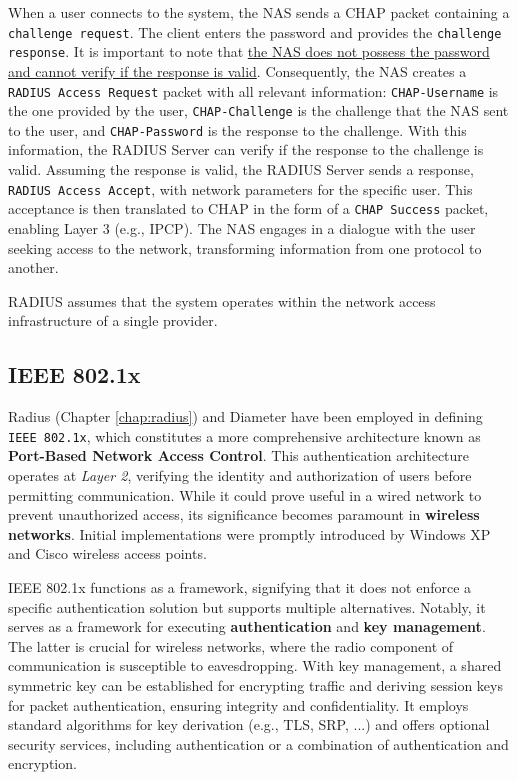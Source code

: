 When a user connects to the system, the NAS sends a CHAP packet containing a \texttt{challenge request}. The client enters the password and provides the \texttt{challenge response}. It is important to note that \underline{the NAS does not possess the password and cannot verify if the response is valid}. Consequently, the NAS creates a \texttt{RADIUS Access Request} packet with all relevant information: \texttt{CHAP-Username} is the one provided by the user, \texttt{CHAP-Challenge} is the challenge that the NAS sent to the user, and \texttt{CHAP-Password} is the response to the challenge. With this information, the RADIUS Server can verify if the response to the challenge is valid. Assuming the response is valid, the RADIUS Server sends a response, \texttt{RADIUS Access Accept}, with network parameters for the specific user. This acceptance is then translated to CHAP in the form of a \texttt{CHAP Success} packet, enabling Layer 3 (e.g., IPCP).
The NAS engages in a dialogue with the user seeking access to the network, transforming information from one protocol to another.

RADIUS assumes that the system operates within the network access infrastructure of a single provider.


\subsection{IEEE 802.1x}\label{chap:802.1x}
Radius (Chapter \ref{chap:radius}) and Diameter have been employed in defining \texttt{IEEE 802.1x}, 
which constitutes a more comprehensive architecture known as \textbf{Port-Based Network Access Control}. 
This authentication architecture operates at \textit{Layer 2}, verifying the identity and authorization of users before permitting communication. While it could prove useful in a wired network to prevent unauthorized access, its significance becomes paramount in \textbf{wireless networks}.
Initial implementations were promptly introduced by Windows XP and Cisco wireless access points.

IEEE 802.1x functions as a framework, signifying that it does not enforce a specific authentication solution but supports multiple alternatives. Notably, it serves as a framework for executing \textbf{authentication} and \textbf{key management}. The latter is crucial for wireless networks, where the radio component of communication is susceptible to eavesdropping. With key management, a shared symmetric key can be established for encrypting traffic and deriving session keys for packet authentication, ensuring integrity and confidentiality. It employs standard algorithms for key derivation (e.g., TLS, SRP, ...) and offers optional security services, including authentication or a combination of authentication and encryption.

